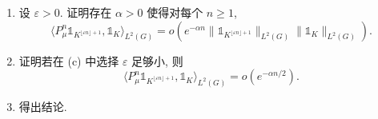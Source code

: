 \begin{enumerate}
\begin{enumerate}
    \[
    \mu^{*n}(L)\mu_G(K) \leq \langle P_{\mu}^n\mathbb{1}_{LK}, \mathbb{1}_K \rangle_{L^2(G)}.
    \]
  \item[(c)] 设 $\varepsilon > 0$. 证明存在 $\alpha > 0$ 使得对每个 $n \geq 1$,
    \[
    \langle P_{\mu}^n\mathbb{1}_{K^{\lfloor \varepsilon n \rfloor + 1}}, \mathbb{1}_K \rangle_{L^2(G)} = o(e^{-\alpha n}\|\mathbb{1}_{K^{\lfloor \varepsilon n \rfloor + 1}}\|_{L^2(G)}\|\mathbb{1}_K\|_{L^2(G)}).
    \]
  \item[(d)] 证明若在 (c) 中选择 $\varepsilon$ 足够小, 则
    \[
    \langle P_{\mu}^n\mathbb{1}_{K^{\lfloor \varepsilon n \rfloor + 1}}, \mathbb{1}_K \rangle_{L^2(G)} = o(e^{-\alpha n/2}).
    \]
  \item[(e)] 得出结论.
  \end{enumerate}
\end{enumerate}
